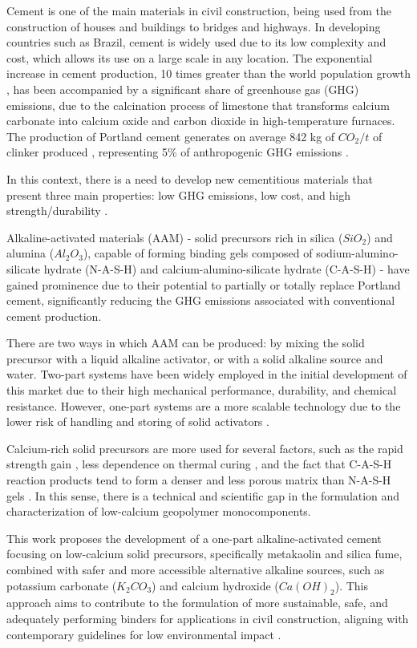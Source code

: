 Cement is one of the main materials in civil construction, being used from the construction of houses and buildings to bridges and highways.
In developing countries such as Brazil, cement is widely used due to its low complexity and cost, which allows its use on a large scale in any location.
The exponential increase in cement production, 10 times greater than the world population growth \cite{united1995world}, has been accompanied by a significant share of greenhouse gas (GHG) emissions, due to the calcination process of limestone that transforms calcium carbonate into calcium oxide and carbon dioxide in high-temperature furnaces.
The production of Portland cement generates on average 842 kg of $CO_2/t$ of clinker produced \cite{andrew2018global}, representing 5\% of anthropogenic GHG emissions \cite{IEA_WBCSD_2009}.

In this context, there is a need to develop new cementitious materials that present three main properties: low GHG emissions, low cost, and high strength/durability \cite{scrivener2018eco}.

Alkaline-activated materials (AAM) - solid precursors rich in silica ($SiO_2$) and alumina ($Al_2O_3$), capable of forming binding gels composed of sodium-alumino-silicate hydrate (N-A-S-H) and calcium-alumino-silicate hydrate (C-A-S-H) - have gained prominence due to their potential to partially or totally replace Portland cement, significantly reducing the GHG emissions associated with conventional cement production.

There are two ways in which AAM can be produced: by mixing the solid precursor with a liquid alkaline activator, or with a solid alkaline source and water.
Two-part systems have been widely employed in the initial development of this market due to their high mechanical performance, durability, and chemical resistance.
However, one-part systems are a more scalable technology due to the lower risk of handling and storing of solid activators \cite{provis2018alkali}.

Calcium-rich solid precursors are more used for several factors, such as the rapid strength gain \cite{provis2014geopolymers}, less dependence on thermal curing \cite{ke2021one}, and the fact that C-A-S-H reaction products tend to form a denser and less porous matrix than N-A-S-H gels \cite{bernal2014engineering}.
In this sense, there is a technical and scientific gap in the formulation and characterization of low-calcium geopolymer monocomponents.

This work proposes the development of a one-part alkaline-activated cement focusing on low-calcium solid precursors, specifically metakaolin and silica fume, combined with safer and more accessible alternative alkaline sources, such as potassium carbonate ($K_2CO_3$) and calcium hydroxide ($Ca(OH)_2$).
This approach aims to contribute to the formulation of more sustainable, safe, and adequately performing binders for applications in civil construction, aligning with contemporary guidelines for low environmental impact \cite{PNRS2016}.